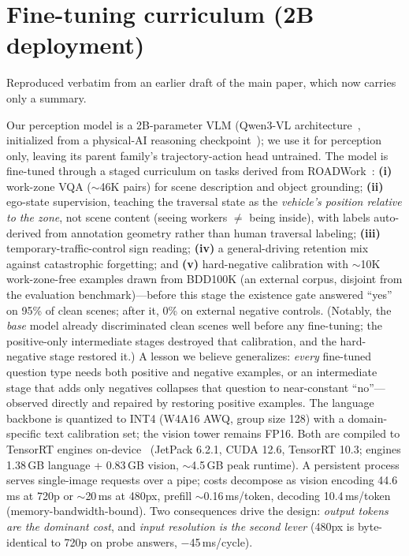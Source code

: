 \documentclass[10pt,twocolumn,letterpaper]{article}
\begin{document}
\section{Fine-tuning curriculum (2B deployment)}
\label{supp:curriculum}

Reproduced verbatim from an earlier draft of the main paper, which now carries only a summary.

Our perception model is a 2B-parameter VLM (Qwen3-VL architecture~\cite{qwen3vl}, initialized from a physical-AI reasoning checkpoint~\cite{nvidia2025cosmosreason}); we use it for perception only, leaving its parent family's trajectory-action head untrained.  The model is fine-tuned through a staged curriculum on tasks derived from ROADWork~\cite{ghosh2025roadwork}: \textbf{(i)} work-zone VQA ($\sim$46K pairs) for scene description and object grounding; \textbf{(ii)} ego-state supervision, teaching the traversal state as the \emph{vehicle's position relative to the zone}, not scene content (seeing workers $\neq$ being inside), with labels auto-derived from annotation geometry rather than human traversal labeling; \textbf{(iii)} temporary-traffic-control sign reading; \textbf{(iv)} a general-driving retention mix against catastrophic forgetting; and \textbf{(v)} hard-negative calibration with $\sim$10K work-zone-free examples drawn from BDD100K (an external corpus, disjoint from the evaluation benchmark)---before this stage the existence gate answered ``yes'' on 95\% of clean scenes; after it, 0\% on external negative controls.  (Notably, the \emph{base} model already discriminated clean scenes well before any fine-tuning; the positive-only intermediate stages destroyed that calibration, and the hard-negative stage restored it.)  A lesson we believe generalizes: \emph{every} fine-tuned question type needs both positive and negative examples, or an intermediate stage that adds only negatives collapses that question to near-constant ``no''---observed directly and repaired by restoring positive examples. The language backbone is quantized to INT4 (W4A16 AWQ, group size 128) with a domain-specific text calibration set; the vision tower remains FP16.  Both are compiled to TensorRT engines on-device~\cite{trtedgellm} (JetPack 6.2.1, CUDA 12.6, TensorRT 10.3; engines 1.38\,GB language + 0.83\,GB vision, $\sim$4.5\,GB peak runtime). A persistent process serves single-image requests over a pipe; costs decompose as vision encoding 44.6\,ms at 720p or $\sim$20\,ms at 480px, prefill $\sim$0.16\,ms/token, decoding 10.4\,ms/token (memory-bandwidth-bound).  Two consequences drive the design: \emph{output tokens are the dominant cost}, and \emph{input resolution is the second lever} (480px is byte-identical to 720p on probe answers, $-$45\,ms/cycle).
\end{document}
